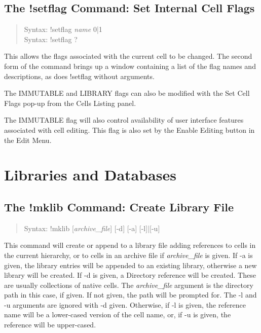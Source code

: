 \subsection{The {\cb !setflag} Command: Set Internal Cell Flags}
\begin{quote}
Syntax: {\vt !setflag {\it name} 0|1}\\
Syntax: {\vt !setflag ?}\\
\end{quote}
This allows the flags associated with the current cell to be changed. 
The second form
of the command brings up a window containing a list of the flag names
and descriptions, as does {\cb !setflag} without arguments.

The {\et IMMUTABLE} and {\et LIBRARY} flags can also be modified with
the {\cb Set Cell Flags} pop-up from the {\cb Cells Listing} panel.

The IMMUTABLE flag will also control availability of user interface
features associated with cell editing.  This flag is also set by the
{\cb Enable Editing} button in the {\cb Edit Menu}.

\section{Libraries and Databases}

\subsection{The {\cb !mklib} Command: Create Library File}
\begin{quote}
Syntax: {\vt !mklib [{\it archive\_file\/}] [-d] [-a] [-l]|[-u]}
\end{quote}
This command will create or append to a library file adding references
to cells in the current hierarchy, or to cells in an archive file if
{\it archive\_file} is given.  If {\vt -a} is given, the library
entries will be appended to an existing library, otherwise a new
library will be created.  If {\vt -d} is given, a {\vt Directory}
reference will be created.  These are usually collections of native
{\Xic} cells.  The {\it archive\_file} argument is the directory path
in this case, if given.  If not given, the path will be prompted for. 
The {\vt -l} and {\vt -u} arguments are ignored with {\vt -d} given. 
Otherwise, if {\vt -l} is given, the reference name will be a
lower-cased version of the cell name, or, if {\vt -u} is given, the
reference will be upper-cased.


